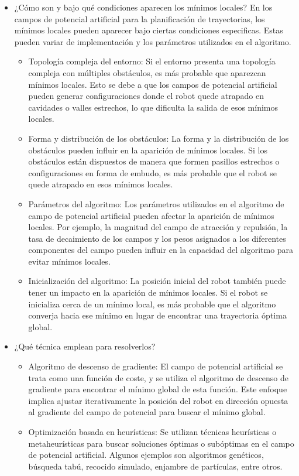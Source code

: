 \documentclass{article}
\begin{document}
\begin{itemize}
\item ¿Cómo son y bajo qué condiciones aparecen los mínimos locales?
  En los campos de potencial artificial para la planificación de trayectorias, los mínimos locales pueden aparecer bajo ciertas condiciones especificas. Estas pueden variar de implementación y los parámetros utilizados en el algoritmo.

  \begin{itemize}
  \item Topología compleja del entorno: Si el entorno presenta una topología compleja con múltiples obstáculos, es más probable que aparezcan mínimos locales. Esto se debe a que los campos de potencial artificial pueden generar configuraciones donde el robot quede atrapado en cavidades o valles estrechos, lo que dificulta la salida de esos mínimos locales.
  \item Forma y distribución de los obstáculos: La forma y la distribución de los obstáculos pueden influir en la aparición de mínimos locales. Si los obstáculos están dispuestos de manera que formen pasillos estrechos o configuraciones en forma de embudo, es más probable que el robot se quede atrapado en esos mínimos locales.
  \item Parámetros del algoritmo: Los parámetros utilizados en el algoritmo de campo de potencial artificial pueden afectar la aparición de mínimos locales. Por ejemplo, la magnitud del campo de atracción y repulsión, la tasa de decaimiento de los campos y los pesos asignados a los diferentes componentes del campo pueden influir en la capacidad del algoritmo para evitar mínimos locales.
  \item Inicialización del algoritmo: La posición inicial del robot también puede tener un impacto en la aparición de mínimos locales. Si el robot se inicializa cerca de un mínimo local, es más probable que el algoritmo converja hacia ese mínimo en lugar de encontrar una trayectoria óptima global.
  \end{itemize}
  
  
\item ¿Qué técnica emplean para resolverlos?

  \begin{itemize}
  \item Algoritmo de descenso de gradiente: El campo de potencial artificial se trata como una función de coste, y se utiliza el algoritmo de descenso de gradiente para encontrar el mínimo global de esta función. Este enfoque implica ajustar iterativamente la posición del robot en dirección opuesta al gradiente del campo de potencial para buscar el mínimo global.
  \item Optimización basada en heurísticas: Se utilizan técnicas heurísticas o metaheurísticas para buscar soluciones óptimas o subóptimas en el campo de potencial artificial. Algunos ejemplos son algoritmos genéticos, búsqueda tabú, recocido simulado, enjambre de partículas, entre otros.
  \end{itemize}
  
\end{itemize}
\end{document}
